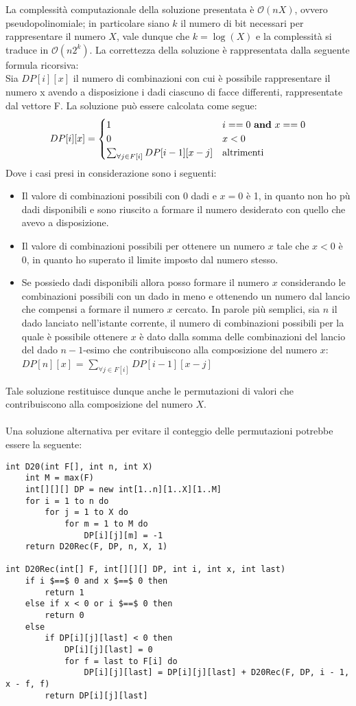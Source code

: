 \documentclass[../cheatSheetAlgoritmi.tex]{subfiles}
\begin{document}
La complessità computazionale della soluzione presentata è $\mathcal{O}(nX)$, ovvero pseudopolinomiale; in particolare siano $k$ il numero di bit necessari per rappresentare il numero $X$, vale dunque che $k = \log(X)$ e la complessità si traduce in $\mathcal{O}(n2^k)$. 
La correttezza della soluzione è rappresentata dalla seguente formula ricorsiva: \\
Sia $DP[i][x]$ il numero di combinazioni con cui è possibile rappresentare il numero x avendo a disposizione i dadi ciascuno di facce differenti, rappresentate dal vettore F. La soluzione può essere calcolata come segue:
\begin{equation*}
    DP[i][x]=\begin{cases}
        1 & \text{$i == 0$ \textbf{and} $x == 0$}\\
        0 & \text{$x < 0$} \\
        \sum_{\forall j \in F[i]} DP[i-1][x - j] & \text{altrimenti}
    \end{cases}
\end{equation*}
Dove i casi presi in considerazione sono i seguenti:
\begin{itemize}
    \item Il valore di combinazioni possibili con 0 dadi e $x = 0$ è 1, in quanto non ho pù dadi disponibili e sono riuscito a formare il numero desiderato con quello che avevo a disposizione.
    \item Il valore di combinazioni possibili per ottenere un numero $x$ tale che $x < 0$ è 0, in quanto ho superato il limite imposto dal numero stesso.
    \item Se possiedo dadi disponibili allora posso formare il numero $x$ considerando le combinazioni possibili con un dado in meno e ottenendo un numero dal lancio che compensi a formare il numero $x$ cercato. In parole più semplici, sia $n$ il dado lanciato nell'istante corrente, il numero di combinazioni possibili per la quale è possibile ottenere $x$ è dato dalla somma delle combinazioni del lancio del dado $n-1$-esimo che contribuiscono alla composizione del numero $x$:
    $DP[n][x]$ = $\sum_{\forall j \in F[i]} DP[i-1][x - j]$
\end{itemize}
Tale soluzione restituisce dunque anche le permutazioni di valori che contribuiscono alla composizione del numero $X$. \\\\
Una soluzione alternativa per evitare il conteggio delle permutazioni potrebbe essere la seguente:
\begin{lstlisting}[caption= D20 senza permutazioni]
int D20(int F[], int n, int X)
    int M = max(F)
    int[][][] DP = new int[1..n][1..X][1..M]
    for i = 1 to n do
        for j = 1 to X do
            for m = 1 to M do
                DP[i][j][m] = -1
    return D20Rec(F, DP, n, X, 1)

int D20Rec(int[] F, int[][][] DP, int i, int x, int last)
    if i $==$ 0 and x $==$ 0 then
        return 1
    else if x < 0 or i $==$ 0 then
        return 0
    else
        if DP[i][j][last] < 0 then
            DP[i][j][last] = 0
            for f = last to F[i] do
                DP[i][j][last] = DP[i][j][last] + D20Rec(F, DP, i - 1, x - f, f)
        return DP[i][j][last]
\end{lstlisting}
\end{document}
